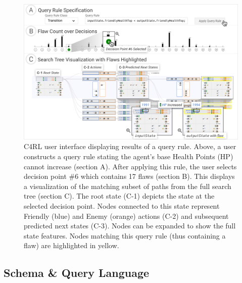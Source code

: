 \documentclass[letterpaper]{article} %
\begin{document}
\begin{figure}[!t]
    \centering
    \includegraphics[width=\textwidth]{images/UI/vc2_mega_squeeze.png}
    \vspace{-10pt}
    \caption{
        C4RL user interface displaying results of a query rule.
        Above, a user constructs a query rule stating the agent's base Health Points (HP) cannot increase (section A).
        After applying this rule, the user selects decision point \#6 which contains 17 flaws (section B).
        This displays a visualization of the matching subset of paths from the full search tree (section C).
        The root state (C-1) depicts the state at the selected decision point. Nodes connected to this state represent Friendly (blue) and Enemy (orange) actions (C-2) and subsequent predicted next states (C-3). Nodes can be expanded to show the full state features.
        Nodes matching this query rule (thus containing a flaw) are highlighted in yellow.
    }
    \label{fig:UI}
\end{figure}





\subsection{Schema \& Query Language}
\end{document}
